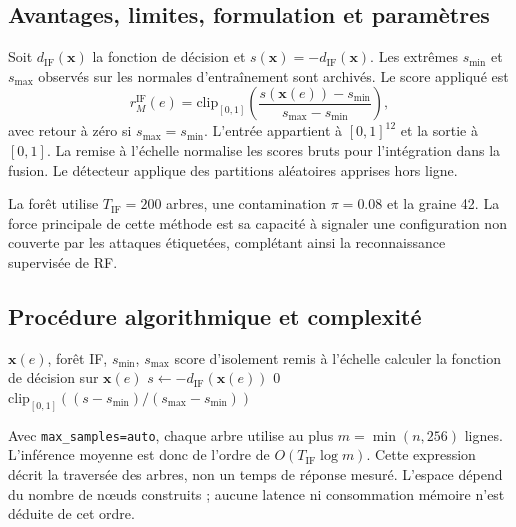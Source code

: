 \documentclass[11pt,a4paper,oneside]{report}
\theoremstyle{definition}
\theoremstyle{plain}
\begin{document}
\subsection*{Avantages, limites, formulation et paramètres}

Soit $d_{\mathrm{IF}}(\mathbf{x})$ la fonction de décision et
$s(\mathbf{x})=-d_{\mathrm{IF}}(\mathbf{x})$. Les extrêmes $s_{\min}$ et
$s_{\max}$ observés sur les normales d'entraînement sont archivés. Le score appliqué est
\begin{equation}
r_M^{\mathrm{IF}}(e)=
\mathrm{clip}_{[0,1]}
\left(\frac{s(\mathbf{x}(e))-s_{\min}}{s_{\max}-s_{\min}}\right),
\label{eq:ai-ro-if}
\end{equation}
avec retour à zéro si $s_{\max}=s_{\min}$. L'entrée appartient à $[0,1]^{12}$ et la
sortie à $[0,1]$. La remise à l'échelle normalise les scores bruts pour l'intégration
dans la fusion. Le détecteur applique des partitions aléatoires apprises hors ligne.

La forêt utilise $T_{\mathrm{IF}}=200$ arbres, une contamination $\pi=0.08$ et la
graine 42. La force principale de cette méthode est sa capacité à signaler une
configuration non couverte par les attaques étiquetées, complétant ainsi la
reconnaissance supervisée de RF.

\subsection*{Procédure algorithmique et complexité}

\begin{algorithm}[H]
\caption{Inférence par forêt d'isolation}
\label{alg:ai-ro-if}
\begin{algorithmic}[1]
\Require $\mathbf{x}(e)$, forêt IF, $s_{\min}$, $s_{\max}$
\Ensure score d'isolement remis à l'échelle
\State calculer la fonction de décision sur $\mathbf{x}(e)$
\State $s\leftarrow-d_{\mathrm{IF}}(\mathbf{x}(e))$
  \State \Return $0$
\Else
  \State \Return $\mathrm{clip}_{[0,1]}((s-s_{\min})/(s_{\max}-s_{\min}))$
\EndIf
\end{algorithmic}
\end{algorithm}

Avec \texttt{max\_samples=auto}, chaque arbre utilise au plus
$m=\min(n,256)$ lignes. L'inférence moyenne est donc de l'ordre de
$O(T_{\mathrm{IF}}\log m)$. Cette expression décrit la traversée des arbres,
non un temps de réponse mesuré. L'espace dépend du nombre de nœuds construits ;
aucune latence ni consommation mémoire n'est déduite de cet ordre.
\end{document}
